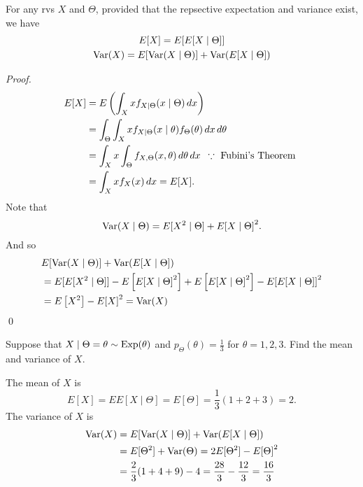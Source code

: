 \documentclass[notoc,notitlepage]{tufte-book}
\begin{document}
\begin{propo}\label{propo:total_expectation_and_total_variance}
  For any rvs $X$ and $\Theta$, provided that the repsective expectation and variance exist, we have
  \begin{gather*}
    E[X] = E[ E[ X \mid \Theta ] ] \\
    \operatorname{Var}(X) = E[ \operatorname{Var}(X \mid \Theta) ] + \operatorname{Var}( E[ X \mid \Theta ] )
  \end{gather*}
\end{propo}

\begin{proof}
  \begin{align*}
    E[X] &= E\left( \int_{X} xf_{X \mid \Theta}(x \mid \Theta) \mathop{}\!d{x} \right) \\
         &= \int_{\Theta} \int_{X} xf_{X \mid \Theta}( x \mid \theta ) f_{\Theta}(\theta) \mathop{}\!d{x} \mathop{}\!d{\theta} \\
         &= \int_{X} x \int_{\Theta} f_{X, \Theta}(x, \theta) \mathop{}\!d{\theta} \mathop{}\!d{x} \enspace \because \text{ Fubini's Theorem } \\
         &= \int_{X} xf_X(x) \mathop{}\!d{x} = E[X].
  \end{align*}
  Note that
  \begin{equation*}
    \operatorname{Var}(X \mid \Theta) = E[ X^2 \mid \Theta ] + E{[ X \mid \Theta ]}^2.
  \end{equation*}
  And so
  \begin{align*}
    &E[\operatorname{Var}(X \mid \Theta)] + \operatorname{Var}( E[ X \mid \Theta ] ) \\
    &= E[ E[ X^2 \mid \Theta ] ] - E \left[ E{[ X \mid \Theta ]}^2 \right] + E \left[ E {[ X \mid \Theta ]}^2 \right] - E{[ E [ X \mid \Theta ] ]}^2 \\
    &= E\left[X^2\right] - E{[X]}^2 = \operatorname{Var}(X)
  \end{align*}\qed\
\end{proof}

\begin{eg}
  Suppose that $X \mid \Theta = \theta \sim \operatorname{Exp}(\theta)$ and $p_{\Theta}(\theta) = \frac{1}{3}$ for $\theta = 1, 2, 3$. Find the mean and variance of $X$.
\end{eg}

\begin{solution}
  The mean of $X$ is
  \begin{equation*}
    E[X] = EE[X \mid \Theta] = E[\Theta] = \frac{1}{3} (1 + 2 + 3) = 2.
  \end{equation*}
  The variance of $X$ is
  \begin{align*}
    \operatorname{Var}(X) &= E[\operatorname{Var}(X \mid \Theta)] + \operatorname{Var}( E[X \mid \Theta] ) \\
            &= E[\Theta^2] + \operatorname{Var}(\Theta) = 2E[\Theta^2] - E{[\Theta]}^2 \\
            &= \frac{2}{3}(1 + 4 + 9) - 4 = \frac{28}{3} - \frac{12}{3} = \frac{16}{3}
  \end{align*}
\end{solution}
\end{document}
